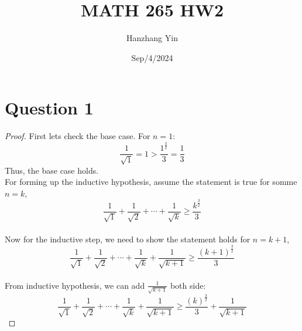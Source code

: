 \documentclass{article}
\title{MATH 265 HW2}
\author{Hanzhang Yin}
\date{Sep/4/2024}
\begin{document}
\maketitle

\section*{Question 1}
\begin{proof}
    First lets check the base case. For $n = 1$: 
    \[ \frac{1}{\sqrt{1}} = 1 > \frac{1^{\frac{3}{2}}}{3} = \frac{1}{3} \]
    Thus, the base case holds.
    \\
    For forming up the inductive hypothesis, assume the statement is true for somme $n = k$, 
    \[ \frac{1}{\sqrt{1}} + \frac{1}{\sqrt{2}} + \cdots + \frac{1}{\sqrt{k}} \geq \frac{k^{\frac{3}{2}}}{3} \]
    \\
    Now for the inductive step, we need to show the statement holds for $n = k + 1$,
    \[  \frac{1}{\sqrt{1}} + \frac{1}{\sqrt{2}} + \cdots + \frac{1}{\sqrt{k}} + \frac{1}{\sqrt{k + 1}} \geq \frac{(k+1)^{\frac{3}{2}}}{3} \]
    \\
    From inductive hypothesis, we can add $\frac{1}{\sqrt{k+1}}$ both side:
    \[ \frac{1}{\sqrt{1}} + \frac{1}{\sqrt{2}} + \cdots + \frac{1}{\sqrt{k}} + \frac{1}{\sqrt{k + 1}} \geq \frac{(k)^{\frac{3}{2}}}{3} + \frac{1}{\sqrt{k + 1}} \]
    \[ \]
\end{proof}
\end{document}
